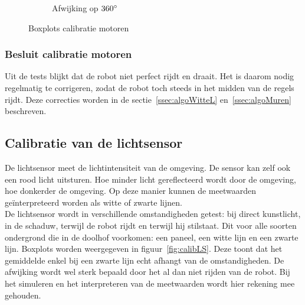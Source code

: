 \documentclass[t1]{penoverslag}
\begin{document}
\begin{figure}
\begin{subfigure}[h]{0.32\textwidth}
                \caption{Afwijking op $360 \degree$}
        \end{subfigure}
 \caption{Boxplots calibratie motoren}
\label{fig:calibM}
\end{figure}

\subsubsection{Besluit calibratie motoren} %
\label{ssec:calibMbesluit}
Uit de tests blijkt dat de robot niet perfect rijdt en draait. Het is daarom nodig regelmatig te corrigeren, zodat de robot toch steeds in het midden van de regels rijdt. Deze correcties worden in de sectie~\ref{ssec:algoWitteL} en~\ref{ssec:algoMuren} beschreven.


\subsection{Calibratie van de lichtsensor} %
\label{ssec:calibLS}
De lichtsensor meet de lichtintensiteit van de omgeving. De sensor kan zelf ook een rood licht uitsturen. Hoe minder licht gereflecteerd wordt door de omgeving, hoe donkerder de omgeving. Op deze manier kunnen de meetwaarden ge\"interpreteerd worden als witte of zwarte lijnen.\\
De lichtsensor wordt in verschillende omstandigheden getest: bij direct kunstlicht, in de schaduw, terwijl de robot rijdt en terwijl hij stilstaat. Dit voor alle soorten ondergrond die in de doolhof voorkomen: een paneel, een witte lijn en een zwarte lijn. Boxplots worden weergegeven in figuur~\ref{fig:calibLS}. Deze toont dat het gemiddelde enkel bij een zwarte lijn echt afhangt van de omstandigheden. De afwijking wordt wel sterk bepaald door het al dan niet rijden van de robot. Bij het simuleren en het interpreteren van de meetwaarden wordt hier rekening mee gehouden.
\end{document}
